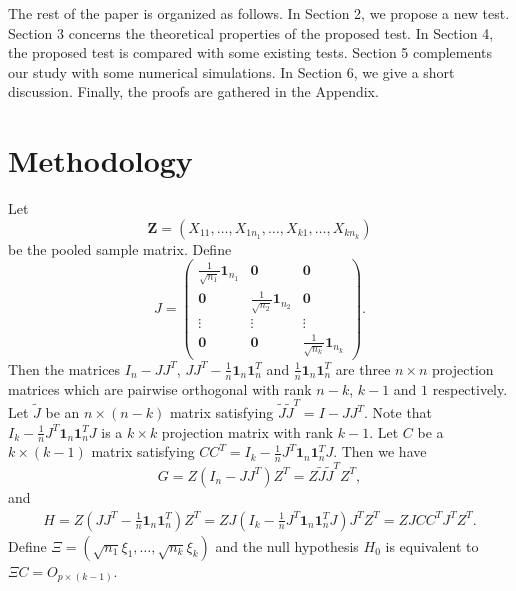 \documentclass[12pt]{article} %
\newcommand{\bZ}{\mathbf{Z}}
\theoremstyle{definition}
\begin{document}
    The rest of the paper is organized  as follows.
    In Section 2, we propose a new test. Section 3 concerns the theoretical properties of the proposed test. In Section 4, the proposed test is compared with some existing tests. Section 5 complements our study with some numerical simulations. In Section 6, we give a short discussion. Finally, the proofs are gathered in the Appendix.




 
\section{Methodology}\label{methodology}

 Let
 $$\bZ=(X_{11},\ldots,X_{1n_1},\ldots,X_{k1},\ldots,X_{kn_k})$$
 be the pooled sample matrix.
 Define
 $$
 J=\begin{pmatrix}
     \frac{1}{\sqrt{n_1}}\mathbf{1}_{n_1}&\mathbf{0} & \mathbf{0}\\
     \mathbf{0}&\frac{1}{\sqrt{n_2}} \mathbf{1}_{n_2}& \mathbf{0}\\
     \vdots &\vdots &\vdots \\
     \mathbf{0}&\mathbf{0}&\frac{1}{\sqrt{n_k}}\mathbf{1}_{n_k}
 \end{pmatrix}.
 $$
Then the matrices $I_n-JJ^T$, $JJ^T-\frac{1}{n}\mathbf{1}_n\mathbf{1}_n^T$ and $\frac{1}{n}\mathbf{1}_n\mathbf{1}_n^T$ are three $n\times n$ projection matrices which are pairwise orthogonal with rank $n-k$, $k-1$ and $1$ respectively.
Let $\tilde{J}$ be an $n\times (n-k)$ matrix satisfying $\tilde{J}\tilde{J}^T =I-JJ^T$.
Note that $I_k-\frac{1}{n}J^T\mathbf{1}_n \mathbf{1}_n^T J$ is a $k\times k$ projection matrix with rank $k-1$.
Let $C$ be a $k\times (k-1)$ matrix satisfying $CC^T=I_k-\frac{1}{n}J^T\mathbf{1}_n \mathbf{1}_n^T J$.
Then we have
$$
G=Z(I_n-JJ^T)Z^T=
Z\tilde{J}\tilde{J}^T Z^T,
$$
and
\begin{equation*}
    \begin{aligned}
        H=Z(JJ^T-\frac{1}{n}\mathbf{1}_n\mathbf{1}_n^T)Z^T
=ZJ(I_k-\frac{1}{n}J^T\mathbf{1}_n \mathbf{1}_n^T J)J^T Z^T
=ZJC C^T J^T Z^T.
    \end{aligned}
\end{equation*}
 Define $\Xi=(\sqrt{n_1}\xi_1,\ldots,\sqrt{n_k}\xi_k)$
 and the null hypothesis $H_0$ is equivalent to $\Xi C=O_{p\times (k-1)}$.
\end{document}

